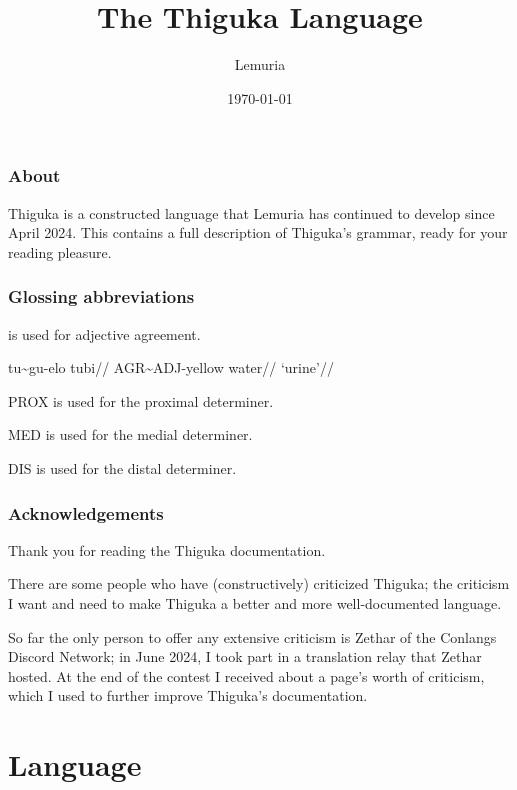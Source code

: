 \documentclass{thigukabook}
\title{The Thiguka Language}
\date{\monthyeardate\today}
\author{Lemuria}
\begin{document}
\maketitle

\newpage

\thigukacopyright{}


\section*{About}
Thiguka is a constructed language that Lemuria has continued to develop since April 2024.
This contains a full description of Thiguka's grammar, ready for your reading pleasure.

\section*{Glossing abbreviations}
\agradj is used for adjective agreement.

\ex
\begingl
    \gla  tu\~{}{}gu-elo tubi//
    \glb  AGR\~{}ADJ-yellow water//
    \glft `urine'//
\endgl
\xe

PROX is used for the proximal determiner.

MED is used for the medial determiner.

DIS is used for the distal determiner.

\section*{Acknowledgements}
Thank you for reading the Thiguka documentation.

There are some people who have (constructively) criticized Thiguka; the criticism I want and need to make Thiguka a better and more well-documented language.

So far the only person to offer any extensive criticism is Zethar of the Conlangs Discord Network; in June 2024, I took part in a translation relay that Zethar hosted.
At the end of the contest I received about a page's worth of criticism, which I used to further improve Thiguka's documentation.

\tableofcontents

\part{Language}







\end{document}
